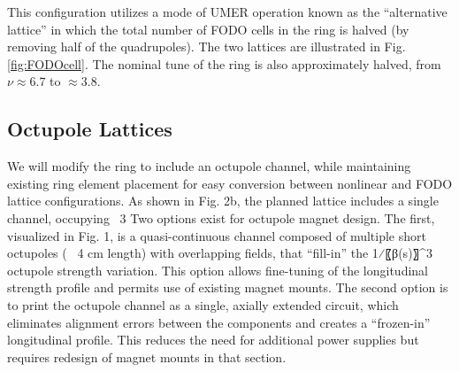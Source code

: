 This configuration utilizes a mode of UMER operation known as the “alternative lattice” in which the total number of FODO cells in the ring is halved (by removing half of the quadrupoles).  The two lattices are illustrated in Fig. \ref{fig:FODOcell}. The nominal tune of the ring is also approximately halved, from $\nu \approx 6.7$ to $\approx 3.8$.



\subsection{Octupole Lattices}

We will modify the ring to include an octupole channel, while maintaining existing ring element placement for easy conversion between nonlinear and FODO lattice configurations. As shown in Fig. 2b, the planned lattice includes a single channel, occupying ~3%
Two options exist for octupole magnet design. The first, visualized in Fig. 1, is a quasi-continuous channel composed of multiple short octupoles (~ 4 cm length) with overlapping fields, that “fill-in” the 1⁄〖β(s)〗^3  octupole strength variation. This option allows fine-tuning of the longitudinal strength profile and permits use of existing magnet mounts. The second option is to print the octupole channel as a single, axially extended circuit, which eliminates alignment errors between the components and creates a “frozen-in” longitudinal profile. This reduces the need for additional power supplies but requires redesign of magnet mounts in that section.
